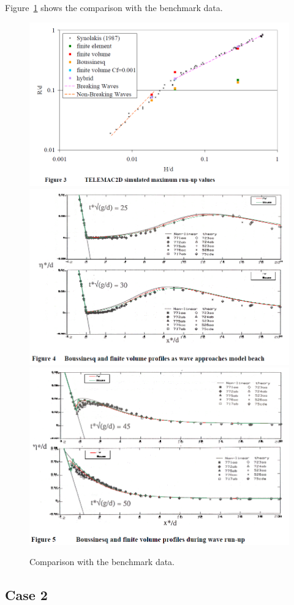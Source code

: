 Figure~\ref{fig:tests:res} shows the comparison with the benchmark data.
\begin{figure}
\centering
\includegraphics[width=.8\textwidth]{img/fig3.png}
\includegraphics[width=.8\textwidth]{img/fig4.png}
\includegraphics[width=.8\textwidth]{img/fig5.png}
\caption{Comparison with the benchmark data.}
\label{fig:tests:res}
\end{figure}

\subsection{Case 2}

